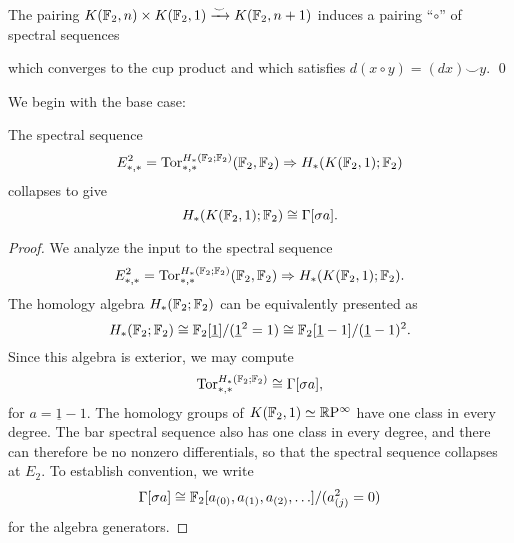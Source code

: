 \begin{lemma}
The pairing $K(\mathbb F_2, n) \times K(\mathbb F_2, 1) \xrightarrow\smile K(\mathbb F_2, n+1)$ induces a pairing ``$\circ$'' of spectral sequences
\begin{center}
\end{center}
which converges to the cup product and which satisfies $d(x \circ y) = (dx) \smile y$.
\qed
\end{lemma}

We begin with the base case:
\begin{lemma}
The spectral sequence \[E_{*, *}^2 = \operatorname{Tor}^{H_*(\mathbb F_2; \mathbb F_2)}_{*, *}(\mathbb F_2, \mathbb F_2) \Rightarrow H_*(K(\mathbb F_2, 1); \mathbb F_2)\] collapses to give \[H_*(K(\mathbb F_2, 1); \mathbb F_2) \cong \Gamma[\sigma a].\]
\end{lemma}
\begin{proof}
We analyze the input to the spectral sequence \[E_{*, *}^2 = \operatorname{Tor}^{H_*(\mathbb F_2; \mathbb F_2)}_{*, *}(\mathbb F_2, \mathbb F_2) \Rightarrow H_*(K(\mathbb F_2, 1); \mathbb F_2).\]
The homology algebra $H_*(\mathbb F_2; \mathbb F_2)$ can be equivalently presented as \[H_*(\mathbb F_2; \mathbb F_2) \cong \mathbb F_2[\underline{1}] / (\underline 1^2 = 1) \cong \mathbb F_2[\underline 1 - 1] / (\underline 1 - 1)^2.\]
Since this algebra is exterior, we may compute \[\operatorname{Tor}^{H_*(\mathbb F_2; \mathbb F_2)}_{*, *} \cong \Gamma[\sigma a],\] for $a = \underline 1 - 1$.
The homology groups of $K(\mathbb F_2, 1) \simeq \mathbb R \mathrm{P}^\infty$ have one class in every degree.
The bar spectral sequence also has one class in every degree, and there can therefore be no nonzero differentials, so that the spectral sequence collapses at $E_2$.
To establish convention, we write \[\Gamma[\sigma a] \cong \mathbb F_2[a_{(0)}, a_{(1)}, a_{(2)}, \ldots] / (a_{(j)}^2 = 0)\] for the algebra generators.
\end{proof}

